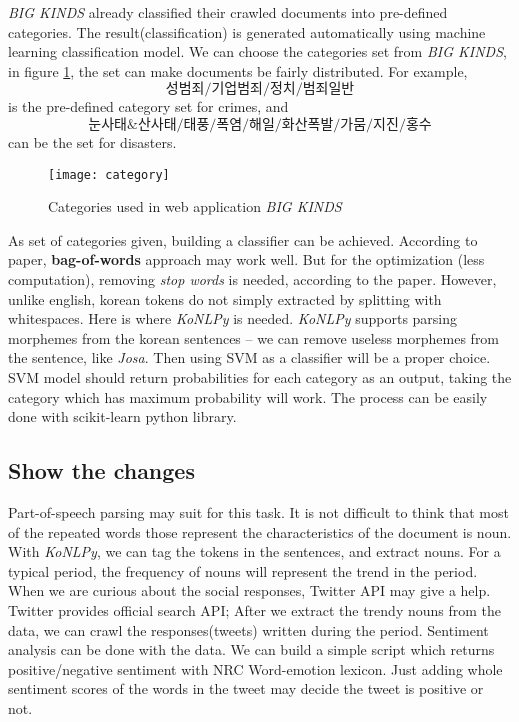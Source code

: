 \documentclass{article}
\begin{document}
\textit{BIG KINDS} already classified their crawled documents
into pre-defined categories.
The result(classification) is generated automatically using
machine learning classification model.
We can choose the categories set from \textit{BIG KINDS},
      in figure \ref{fig:category},
the set can make documents be fairly distributed.
For example, \[ \textbf{성범죄} / \textbf{기업범죄} / \textbf{정치} / \textbf{범죄일반}\]
is the pre-defined category set for crimes, and
\[ \textbf{눈사태\&산사태} / \textbf{태풍} / \textbf{폭염} / \textbf{해일} /
\textbf{화산폭발} / \textbf{가뭄} / \textbf{지진} / \textbf{홍수} \]
can be the set for disasters.

\begin{figure}[!htbp]
  \centering
  \texttt{[image: category]}
  \caption{Categories used in web application \textit{BIG KINDS}}
  \label{fig:category}
\end{figure}

As set of categories given, building a classifier can be achieved.
According to paper\cite{textmining}, \textbf{bag-of-words}
approach may work well.
But for the optimization (less computation),
removing \textit{stop words} is needed, according to the paper.
However, unlike english, korean tokens do not simply extracted
by splitting with whitespaces.
Here is where \textit{KoNLPy}\cite{park2014konlpy} is needed.
\textit{KoNLPy} supports parsing morphemes from the korean sentences --
we can remove useless morphemes from the sentence, like \textit{Josa}.
Then using SVM as a classifier will be a proper choice.
SVM model should return probabilities for each category as an output,
taking the category which has maximum probability will work.
The process can be easily done with scikit-learn\cite{scikit-learn} python library.


\subsection{Show the changes}

Part-of-speech parsing may suit for this task.
It is not difficult to think that most of the repeated words
those represent the characteristics of the document is noun.
With \textit{KoNLPy}, we can tag the tokens in the sentences, and extract nouns.
For a typical period, the frequency of nouns will represent
the trend in the period.
When we are curious about the social responses, Twitter API may give a help.
Twitter provides official search API;
After we extract the trendy nouns from the data,
we can crawl the responses(tweets) written during the period.
Sentiment analysis can be done with the data.
We can build a simple script which returns positive/negative sentiment
with NRC Word-emotion lexicon\cite{Mohammad13}.
Just adding whole sentiment scores of the words in the tweet may decide
the tweet is positive or not.
\end{document}
